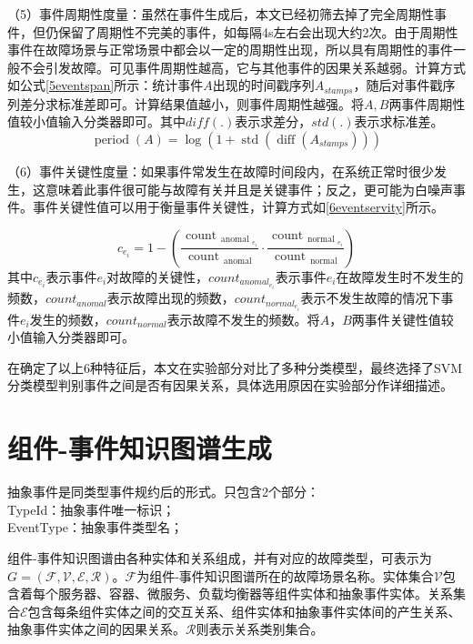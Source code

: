（5）事件周期性度量：虽然在事件生成后，本文已经初筛去掉了完全周期性事件，但仍保留了周期性不完美的事件，如每隔4s左右会出现大约2次。由于周期性事件在故障场景与正常场景中都会以一定的周期性出现，所以具有周期性的事件一般不会引发故障。可见事件周期性越高，它与其他事件的因果关系越弱。计算方式如公式\ref{5eventspan}所示：统计事件$A$出现的时间戳序列$A_{stamps}$，随后对事件戳序列差分求标准差即可。计算结果值越小，则事件周期性越强。将$A,B$两事件周期性值较小值输入分类器即可。其中$diff(.)$表示求差分，$std(.)$表示求标准差。
\begin{equation}
    \operatorname{period}(A)=\log \left(1+\operatorname{std}\left(\operatorname{diff}\left(A_{stamps}\right)\right)\right)\label{5eventspan}
\end{equation}

（6）事件关键性度量：如果事件常发生在故障时间段内，在系统正常时很少发生，这意味着此事件很可能与故障有关并且是关键事件；反之，更可能为白噪声事件。事件关键性值可以用于衡量事件关键性，计算方式如\ref{6eventservity}所示。

\begin{equation}
    c_{e_{i}}=1-\left(\frac{ \text { count }_{\text {anomal }_{e_{i}}}}{\text { count }_{\text {anomal }}} \cdot \frac{  \text { count }_{\text {normal }_{e_{i}}}}{\text { count }_{\text {normal }}}\right)
    \label{6eventservity}
\end{equation}
其中$c_{e_i}$表示事件$e_i$对故障的关键性，${count}_{{anomal}_{e_i}}$表示事件$e_i$在故障发生时不发生的频数，${count}_{anomal}$表示故障出现的频数，${count}_{{normal}_{e_i}}$表示不发生故障的情况下事件$e_i$发生的频数，${count}_{normal}$表示故障不发生的频数。将$A$，$B$两事件关键性值较小值输入分类器即可。

在确定了以上6种特征后，本文在实验部分对比了多种分类模型，最终选择了SVM分类模型判别事件之间是否有因果关系，具体选用原因在实验部分作详细描述。

\section{组件-事件知识图谱生成}\label{graph-generate}
\begin{definition}[抽象事件]
    抽象事件是同类型事件规约后的形式。只包含2个部分：
    \\TypeId：抽象事件唯一标识；
    \\EventType：抽象事件类型名；
    \label{abstract_event}
\end{definition}
\begin{definition}[组件-事件知识图谱]
    组件-事件知识图谱由各种实体和关系组成，并有对应的故障类型，可表示为$G=(\mathcal{F}, \mathcal{V}, \mathcal{E}, \mathcal{R})$。$\mathcal{F}$为组件-事件知识图谱所在的故障场景名称。实体集合$\mathcal{V}$包含着每个服务器、容器、微服务、负载均衡器等组件实体和抽象事件实体。关系集合$\mathcal{E}$包含每条组件实体之间的交互关系、组件实体和抽象事件实体间的产生关系、抽象事件实体之间的因果关系。$\mathcal{R}$则表示关系类别集合。
    \label{device-event-graph}
\end{definition}

